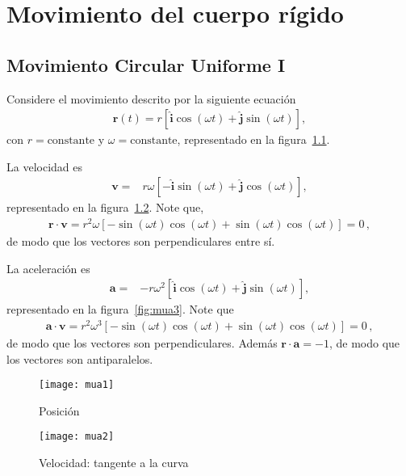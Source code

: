 
\chapter{Movimiento del cuerpo rígido}

\section{Movimiento Circular Uniforme I}

Considere el movimiento descrito por la siguiente ecuación
\begin{align}
  \label{eq:mua}
  \mathbf{r}(t)=r\left[\hat{\mathbf{i}}\cos(\omega t)+\hat{\mathbf{j}}\sin(\omega t)\right],
\end{align}
con $r=\text{constante}$ y $\omega=\text{constante}$, representado en la figura~\ref{fig:mua1}.

La velocidad es
\begin{align}
  \mathbf{v}=&%
  r\omega\left[-\hat{\mathbf{i}}\sin(\omega t)+\hat{\mathbf{j}}\cos(\omega t)\right],
\end{align}
representado en la figura~\ref{fig:mua2}. Note que, 
\begin{align*}
\mathbf{r}\cdot\mathbf{v}=r^2\omega 
   \left[-\sin(\omega t)\cos(\omega t)+\sin(\omega t)\cos(\omega t) \right]
  =0\,,
\end{align*}
de modo que los vectores son perpendiculares entre sí.

La aceleración es
\begin{align}
  \mathbf{a}=&%
  -r\omega^2\left[\hat{\mathbf{i}}\cos(\omega t)+\hat{\mathbf{j}}\sin(\omega t)\right],
\end{align}
representado en la figura~\ref{fig:mua3}. Note que
\begin{align*}
  \mathbf{a}\cdot\mathbf{v}=r^2\omega^3 
   \left[-\sin(\omega t)\cos(\omega t)+\sin(\omega t)\cos(\omega t) \right]
  =0\,,
\end{align*}
de modo que los vectores son perpendiculares. Además 
$\mathbf{r}\cdot\mathbf{a}=-1$, de modo que los vectores son antiparalelos.


\begin{frame}
  \begin{figure}
    \centering
    \texttt{[image: mua1]}    
    \caption{Posici\'on}
    \label{fig:mua1}
  \end{figure}

\end{frame}
\begin{frame}
  \begin{figure}
    \centering
    \texttt{[image: mua2]}    
    \caption{Velocidad: tangente a la curva}
    \label{fig:mua2}
  \end{figure}
\end{frame}


